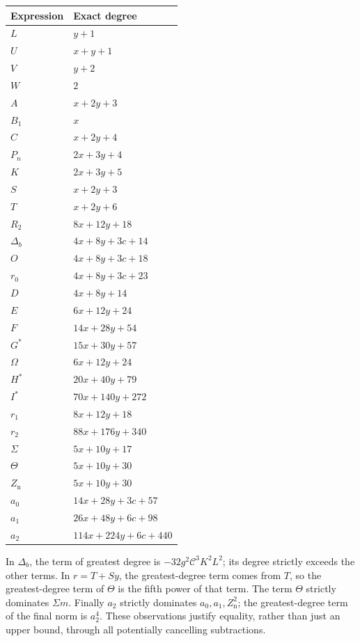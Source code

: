 \documentclass[11pt]{article}
\newcommand{\capC}{\mathscr C}
\theoremstyle{definition}
\theoremstyle{remark}
\numberwithin{equation}{section}
\begin{document}
\begin{longtable}{@{}ll@{}}
\toprule
Expression & Exact degree\\
\midrule
\endhead
\(L\) & \(y+1\)\\
\(U\) & \(x+y+1\)\\
\(V\) & \(y+2\)\\
\(W\) & \(2\)\\
\(A\) & \(x+2y+3\)\\
\(B_1\) & \(x\)\\
\(C\) & \(x+2y+4\)\\
\(P_n\) & \(2x+3y+4\)\\
\(K\) & \(2x+3y+5\)\\
\(S\) & \(x+2y+3\)\\
\(T\) & \(x+2y+6\)\\
\(R_2\) & \(8x+12y+18\)\\
\(\Delta_b\) & \(4x+8y+3c+14\)\\
\(O\) & \(4x+8y+3c+18\)\\
\(r_0\) & \(4x+8y+3c+23\)\\
\(D\) & \(4x+8y+14\)\\
\(E\) & \(6x+12y+24\)\\
\(F\) & \(14x+28y+54\)\\
\(G^*\) & \(15x+30y+57\)\\
\(\Omega\) & \(6x+12y+24\)\\
\(H^*\) & \(20x+40y+79\)\\
\(I^*\) & \(70x+140y+272\)\\
\(r_1\) & \(8x+12y+18\)\\
\(r_2\) & \(88x+176y+340\)\\
\(\Sigma\) & \(5x+10y+17\)\\
\(\Theta\) & \(5x+10y+30\)\\
\(Z_{\mathrm n}\) & \(5x+10y+30\)\\
\(a_0\) & \(14x+28y+3c+57\)\\
\(a_1\) & \(26x+48y+6c+98\)\\
\(a_2\) & \(114x+224y+6c+440\)\\
\bottomrule
\end{longtable}

In \(\Delta_b\), the term of greatest degree is
\(-32g^2\capC^3K^2L^2\); its degree strictly exceeds the other terms.
In \(r=T+Sy\), the greatest-degree term comes from \(T\), so the
greatest-degree term of \(\Theta\) is the fifth power of that term.
The term \(\Theta\) strictly dominates \(\Sigma m\).
Finally \(a_2\) strictly dominates \(a_0,a_1,Z_{\mathrm n}^2\);
the greatest-degree term of the final norm is \(a_2^4\).
These observations justify equality, rather than just an upper bound,
through all potentially cancelling subtractions.
\end{document}
